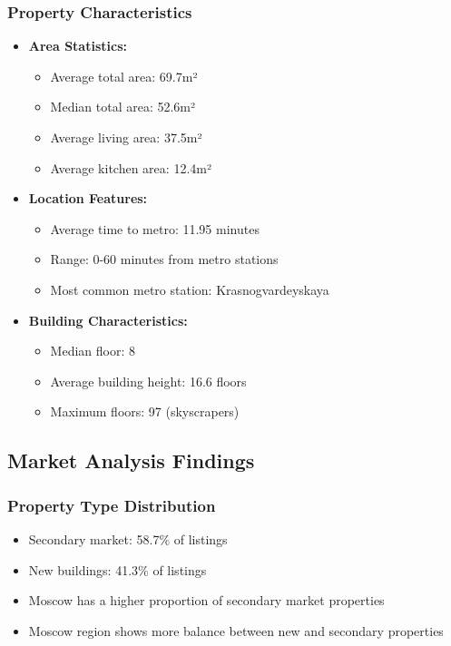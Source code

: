 \documentclass[12pt,a4paper]{report}
\begin{document}
\subsubsection{Property Characteristics}
\begin{itemize}
    \item \textbf{Area Statistics:}
    \begin{itemize}
        \item Average total area: 69.7m²
        \item Median total area: 52.6m²
        \item Average living area: 37.5m²
        \item Average kitchen area: 12.4m²
    \end{itemize}
    
    \item \textbf{Location Features:}
    \begin{itemize}
        \item Average time to metro: 11.95 minutes
        \item Range: 0-60 minutes from metro stations
        \item Most common metro station: Krasnogvardeyskaya
    \end{itemize}
    
    \item \textbf{Building Characteristics:}
    \begin{itemize}
        \item Median floor: 8
        \item Average building height: 16.6 floors
        \item Maximum floors: 97 (skyscrapers)
    \end{itemize}
\end{itemize}

\subsection{Market Analysis Findings}
\subsubsection{Property Type Distribution}
\begin{itemize}
    \item Secondary market: 58.7\% of listings
    \item New buildings: 41.3\% of listings
    \item Moscow has a higher proportion of secondary market properties
    \item Moscow region shows more balance between new and secondary properties
\end{itemize}
\end{document}
